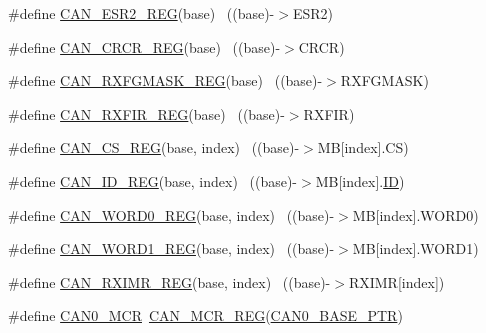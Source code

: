 \begin{DoxyCompactItemize}
\item 
\#define \hyperlink{group___c_a_n___register___accessor___macros_gac7a8b908fcbf6e6ab0e1334e4fc016c2}{C\+A\+N\+\_\+\+E\+S\+R2\+\_\+\+R\+EG}(base)                                          ~((base)-\/$>$E\+S\+R2)
\item 
\#define \hyperlink{group___c_a_n___register___accessor___macros_ga0521321bfb9492998974d3ad267a8141}{C\+A\+N\+\_\+\+C\+R\+C\+R\+\_\+\+R\+EG}(base)                                          ~((base)-\/$>$C\+R\+CR)
\item 
\#define \hyperlink{group___c_a_n___register___accessor___macros_gaba4437c8c233beb2457cd30d2be5defa}{C\+A\+N\+\_\+\+R\+X\+F\+G\+M\+A\+S\+K\+\_\+\+R\+EG}(base)                                  ~((base)-\/$>$R\+X\+F\+G\+M\+A\+SK)
\item 
\#define \hyperlink{group___c_a_n___register___accessor___macros_ga87e42ff030ce54ff9e1a0c09c05ad4de}{C\+A\+N\+\_\+\+R\+X\+F\+I\+R\+\_\+\+R\+EG}(base)                                        ~((base)-\/$>$R\+X\+F\+IR)
\item 
\#define \hyperlink{group___c_a_n___register___accessor___macros_gac99a637d119cf05e14250a1465275522}{C\+A\+N\+\_\+\+C\+S\+\_\+\+R\+EG}(base,  index)                                  ~((base)-\/$>$MB\mbox{[}index\mbox{]}.CS)
\item 
\#define \hyperlink{group___c_a_n___register___accessor___macros_ga081389bb65f5ba1945fa2984d057044e}{C\+A\+N\+\_\+\+I\+D\+\_\+\+R\+EG}(base,  index)                                  ~((base)-\/$>$MB\mbox{[}index\mbox{]}.\hyperlink{samr21__xpro_200std__low__power__mode_200std__low__power__mode_8c_a77ceac8d6af195fe72f95f6afd87c45e}{ID})
\item 
\#define \hyperlink{group___c_a_n___register___accessor___macros_gab486ab7c313c1c3ab3ea1d146a4e4597}{C\+A\+N\+\_\+\+W\+O\+R\+D0\+\_\+\+R\+EG}(base,  index)                            ~((base)-\/$>$MB\mbox{[}index\mbox{]}.W\+O\+R\+D0)
\item 
\#define \hyperlink{group___c_a_n___register___accessor___macros_gabea0fd7f957d3c4e7770f1670aff54dc}{C\+A\+N\+\_\+\+W\+O\+R\+D1\+\_\+\+R\+EG}(base,  index)                            ~((base)-\/$>$MB\mbox{[}index\mbox{]}.W\+O\+R\+D1)
\item 
\#define \hyperlink{group___c_a_n___register___accessor___macros_gabcdb674583aff011e9cae0837f6abd5a}{C\+A\+N\+\_\+\+R\+X\+I\+M\+R\+\_\+\+R\+EG}(base,  index)                            ~((base)-\/$>$R\+X\+I\+MR\mbox{[}index\mbox{]})
\item 
\#define \hyperlink{group___c_a_n___register___accessor___macros_ga300565478bb512e7ca03af0ecf31137a}{C\+A\+N0\+\_\+\+M\+CR}~\hyperlink{group___c_a_n___register___accessor___macros_ga266f3270836a0e2113e665b27e8469c3}{C\+A\+N\+\_\+\+M\+C\+R\+\_\+\+R\+EG}(\hyperlink{group___c_a_n___peripheral_ga1ee8f499e10af9b8e3132e0168e519b9}{C\+A\+N0\+\_\+\+B\+A\+S\+E\+\_\+\+P\+TR})

\end{DoxyCompactItemize}
